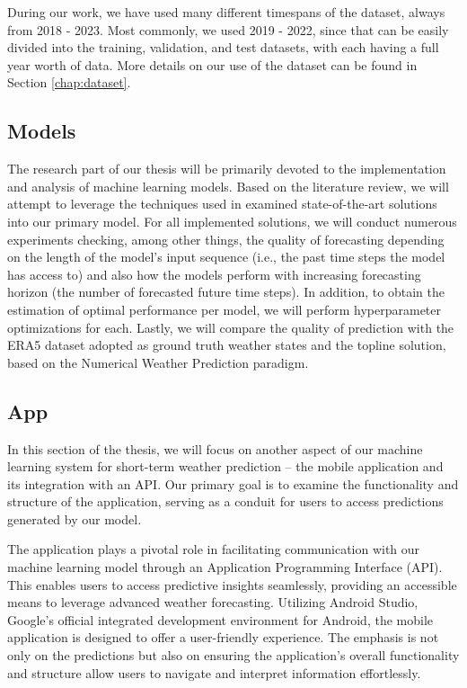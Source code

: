 During our work, we have used many different timespans of the dataset, always from 2018 - 2023. Most commonly, we used 2019 - 2022, since that can be easily divided into the training, validation, and test datasets, with each having a full year worth of data. More details on our use of the dataset can be found in Section \ref{chap:dataset}.

\subsection{Models}
The research part of our thesis will be primarily devoted to the implementation and analysis of machine learning models. Based on the literature review, we will attempt to leverage the techniques used in examined state-of-the-art solutions into our primary model. For all implemented solutions, we will conduct numerous experiments checking, among other things, the quality of forecasting depending on the length of the model's input sequence (i.e., the past time steps the model has access to) and also how the models perform with increasing forecasting horizon (the number of forecasted future time steps). In addition, to obtain the estimation of optimal performance per model, we will perform hyperparameter optimizations for each. Lastly, we will compare the quality of prediction with the ERA5 dataset adopted as ground truth weather states and the topline solution, based on the Numerical Weather Prediction paradigm. 

\subsection{App}
In this section of the thesis, we will focus on another aspect of our machine learning system for short-term weather prediction – the mobile application and its integration with an API. Our primary goal is to examine the functionality and structure of the application, serving as a conduit for users to access predictions generated by our model.

The application plays a pivotal role in facilitating communication with our machine learning model through an Application Programming Interface (API). This enables users to access predictive insights seamlessly, providing an accessible means to leverage advanced weather forecasting. Utilizing Android Studio, Google's official integrated development environment for Android, the mobile application is designed to offer a user-friendly experience. The emphasis is not only on the predictions but also on ensuring the application's overall functionality and structure allow users to navigate and interpret information effortlessly.

